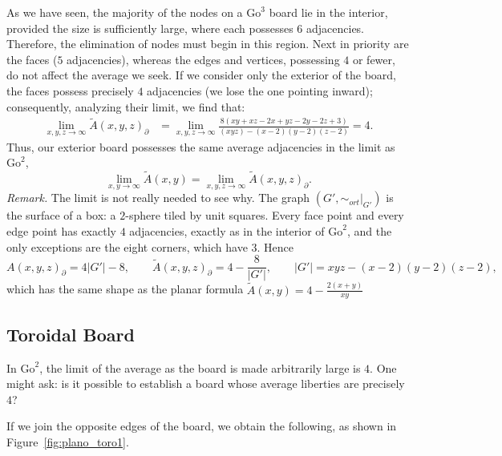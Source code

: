 As we have seen, the majority of the nodes on a \(\mathrm{Go}^{3}\) board lie in the interior, provided the size is sufficiently large, where each possesses $6$ adjacencies. Therefore, the elimination of nodes must begin in this region. Next in priority are the faces ($5$ adjacencies), whereas the edges and vertices, possessing $4$ or fewer, do not affect the average we seek. If we consider only the exterior of the board, the faces possess precisely $4$ adjacencies (we lose the one pointing inward); consequently, analyzing their limit, we find that:
\begin{align*}
	\lim_{x,y,z\to\infty} \tilde{A}(x,y,z)_{\partial}&=
	\lim_{x,y,z\to\infty}\frac{8 (x y + x z - 2 x + y z - 2 y - 2 z + 3)}{(xyz)-(x-2)(y-2)(z-2)}=4.
\end{align*}
Thus, our exterior board possesses the same average adjacencies in the limit as \(\mathrm{Go}^{2}\),
$$\lim_{x,y\to\infty}  \tilde{A}(x,y)= \lim_{x,y,z\to\infty} \tilde{A}(x,y,z)_{\partial}.$$
\textit{Remark.} The limit is not really needed to see why. The graph \((G',\sim_{ort}|_{G'})\) is the surface of a box: a $2$-sphere tiled by unit squares. Every face point and every edge point has exactly $4$ adjacencies, exactly as in the interior of $\mathrm{Go}^{2}$, and the only exceptions are the eight corners, which have $3$. Hence
$$A(x,y,z)_{\partial}=4|G'|-8,\qquad \tilde{A}(x,y,z)_{\partial}=4-\frac{8}{|G'|},\qquad |G'|=xyz-(x-2)(y-2)(z-2),$$
which has the same shape as the planar formula \(\tilde{A}(x,y)=4-\tfrac{2(x+y)}{xy}\)


\subsection{Toroidal Board}
\label{key:sectoro}
In \(\mathrm{Go}^{2}\), the limit of the average as the board is made arbitrarily large is $4$. One might ask: is it possible to establish a board whose average liberties are precisely $4$?

If we join the opposite edges of the board, we obtain the following, as shown in Figure~\ref{fig:plano_toro1}.

